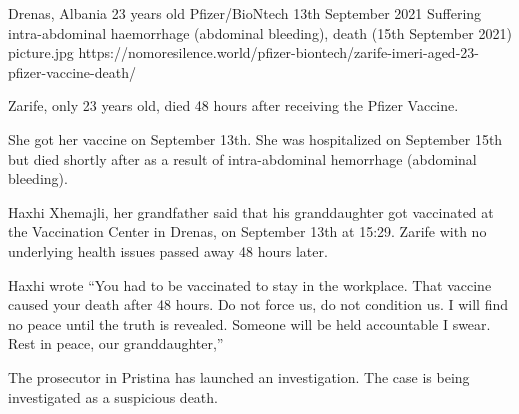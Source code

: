 {Drenas, Albania}
{23 years old}
{Pfizer/BioNtech}
{13th September 2021}
{Suffering intra-abdominal haemorrhage (abdominal bleeding), death (15th September 2021)}
{picture.jpg}
{https://nomoresilence.world/pfizer-biontech/zarife-imeri-aged-23-pfizer-vaccine-death/}
{

Zarife, only 23 years old, died 48 hours after receiving the Pfizer Vaccine.

She got her vaccine on September 13th. She was hospitalized on September 15th
but died shortly after as a result of intra-abdominal hemorrhage (abdominal
bleeding).

Haxhi Xhemajli, her grandfather said that his granddaughter got vaccinated at
the Vaccination Center in Drenas, on September 13th at 15:29. Zarife with no
underlying health issues passed away 48 hours later.

Haxhi wrote “You had to be vaccinated to stay in the workplace. That vaccine
caused your death after 48 hours. Do not force us, do not condition us. I will
find no peace until the truth is revealed. Someone will be held accountable I
swear. Rest in peace, our granddaughter,”

The prosecutor in Pristina has launched an investigation. The case is being
investigated as a suspicious death.

}
